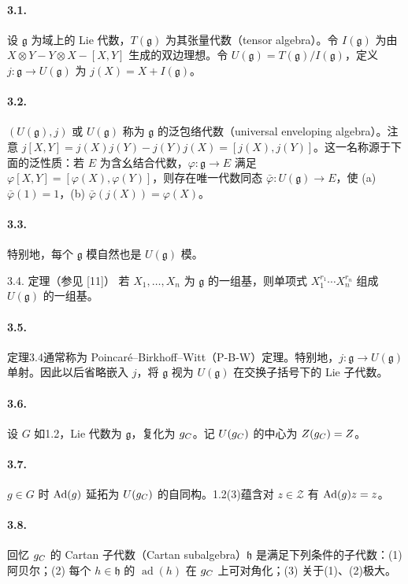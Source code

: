 \paragraph*{3.1.} 设 $\mathfrak g$ 为域上的 Lie 代数，$T(\mathfrak g)$ 为其张量代数（tensor algebra）。令 $I(\mathfrak g)$ 为由 $X\otimes Y-Y\otimes X-[X,Y]$ 生成的双边理想。令 $U(\mathfrak g)=T(\mathfrak g)/I(\mathfrak g)$，定义 $j:\mathfrak g\to U(\mathfrak g)$ 为 $j(X)=X+I(\mathfrak g)$。
\paragraph*{3.2.} $(U(\mathfrak g),j)$ 或 $U(\mathfrak g)$ 称为 $\mathfrak g$ 的泛包络代数（universal enveloping algebra）。注意 $j[X,Y]=j(X)j(Y)-j(Y)j(X)=[j(X),j(Y)]$。这一名称源于下面的泛性质：若 $E$ 为含幺结合代数，$\varphi:\mathfrak g\to E$ 满足 $\varphi[X,Y]=[\varphi(X),\varphi(Y)]$，则存在唯一代数同态 $\bar\varphi:U(\mathfrak g)\to E$，使 (a) $\bar\varphi(1)=1$，(b) $\bar\varphi(j(X))=\varphi(X)$。
\paragraph*{3.3.} 特别地，每个 $\mathfrak g$ 模自然也是 $U(\mathfrak g)$ 模。
\begin{originaltheorem}{3.4. 定理（参见 [11]）}
若 $X_1,\ldots,X_n$ 为 $\mathfrak g$ 的一组基，则单项式 $X_1^{r_1}\cdots X_n^{r_n}$ 组成 $U(\mathfrak g)$ 的一组基。
\end{originaltheorem}
\paragraph*{3.5.} 定理3.4通常称为 Poincaré--Birkhoff--Witt（P-B-W）定理。特别地，$j:\mathfrak g\to U(\mathfrak g)$ 单射。因此以后省略嵌入 $j$，将 $\mathfrak g$ 视为 $U(\mathfrak g)$ 在交换子括号下的 Lie 子代数。
\paragraph*{3.6.} 设 $G$ 如1.2，Lie 代数为 $\mathfrak g$，复化为 $g_{C}$。记 $U(g_{C})$ 的中心为 $Z(g_{C})=Z$。
\paragraph*{3.7.} $g\in G$ 时 $\operatorname{Ad}(g)$ 延拓为 $U(g_{C})$ 的自同构。1.2(3)蕴含对 $z\in\mathcal Z$ 有 $\operatorname{Ad}(g)z=z$。
\paragraph*{3.8.} 回忆 $g_{C}$ 的 Cartan 子代数（Cartan subalgebra）$\mathfrak h$ 是满足下列条件的子代数：(1) 阿贝尔；(2) 每个 $h\in\mathfrak h$ 的 $\operatorname{ad}(h)$ 在 $g_{C}$ 上可对角化；(3) 关于(1)、(2)极大。

